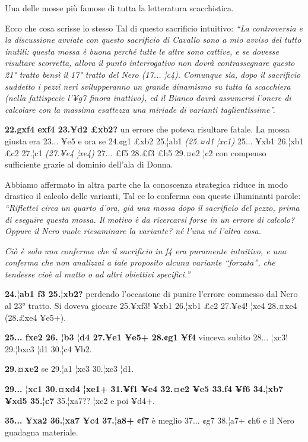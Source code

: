 Una delle mosse più famose di tutta la letteratura scacchistica.

Ecco che cosa scrisse lo stesso Tal di questo sacrificio intuitivo:
\emph{``La controversia e la discussione avviate con questo sacrificio
di Cavallo sono a mio avviso del tutto inutili: questa mossa è buona
perché tutte le altre sono cattive, e se dovesse risultare scorretta,
allora il punto interrogativo non dovrà contrassegnare questo 21° tratto
bensì il 17° tratto del Nero (17... ¦c4). Comunque sia, dopo il
sacrificio suddetto i pezzi neri svilupperanno un grande dinamismo su
tutta la scacchiera (nella fattispecie l'¥g7 finora inattivo), ed il
Bianco dovrà assumersi l'onere di calcolare con la massima esattezza una
miriade di varianti taglientissime''.}

\textbf{22.gxf4 exf4 23.¥d2 £xb2?} un errore che poteva risultare
fatale. La mossa giusta era 23... ¥e5 e ora se 24.¢g1 £xb2 25.¦ab1
\emph{(25.¤d1 ¦xc1)} 25... ¥xb1 26.¦xb1 £c2 27.¦c1 \emph{(27.¥e4 ¦xe4)}
27... £f5 28.£f3 £h5 29.¤e2 ¦c2 con compenso sufficiente grazie al
dominio dell'ala di Donna.

Abbiamo affermato in altra parte che la conoscenza strategica riduce in
modo drastico il calcolo delle varianti, Tal ce lo conferma con queste
illuminanti parole: \emph{``Riflettei circa un quarto d'ora, già una
mossa dopo il sacrificio del pezzo, prima di eseguire questa mossa. Il
motivo è da ricercarsi forse in un errore di calcolo? Oppure il Nero
vuole riesaminare la variante? né l'una né l'altra cosa.}

\emph{Ciò è solo una conferma che il sacrificio in f4 era puramente
intuitivo, e una conferma che non analizzai a tale proposito alcuna
variante ``forzata'', che tendesse cioè al matto o ad altri obiettivi
specifici.''}

\textbf{24.¦ab1 f3 25.¦xb2?} perdendo l'occasione di punire l'errore
commesso dal Nero al 23° tratto. Si doveva giocare 25.¥xf3! ¥xb1 26.¦xb1
£c2 27.¥e4! ¦xe4 28.¤xe4 (28.£xe4 ¥e5+).

\textbf{25... fxe2 26. ¦b3 ¦d4 27.¥e1 ¥e5+ 28.¢g1 ¥f4} vinceva subito
28... ¦xc3! 29.¦bxc3 ¦d1 30.¦c4 ¥b2.

\textbf{29.¤xe2} se 29.¦a1 ¦xc3 30.¦xc3 ¦d1.

\textbf{29... ¦xc1 30.¤xd4 ¦xe1+ 31.¥f1 ¥e4 32.¤e2 ¥e5 33.f4 ¥f6 34.¦xb7
¥xd5 35.¦c7} 35.¦xa7?? ¦xe2 e poi ¥d4+.

\textbf{35... ¥xa2 36.¦xa7 ¥c4 37.¦a8+ ¢f7} è meglio 37... ¢g7 38.¦a7+
¢h6 e il Nero guadagna materiale.

